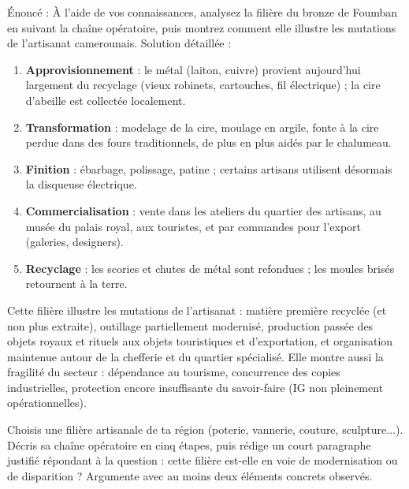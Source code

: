 \documentclass[11pt]{article}
\begin{document}
\begin{exoresolu}
Énoncé : À l'aide de vos connaissances, analysez la filière du bronze de Foumban en suivant la chaîne opératoire, puis montrez comment elle illustre les mutations de l'artisanat camerounais.
\tcblower
Solution détaillée :
\begin{enumerate}
\item \textbf{Approvisionnement} : le métal (laiton, cuivre) provient aujourd'hui largement du recyclage (vieux robinets, cartouches, fil électrique) ; la cire d'abeille est collectée localement.
\item \textbf{Transformation} : modelage de la cire, moulage en argile, fonte à la cire perdue dans des fours traditionnels, de plus en plus aidés par le chalumeau.
\item \textbf{Finition} : ébarbage, polissage, patine ; certains artisans utilisent désormais la disqueuse électrique.
\item \textbf{Commercialisation} : vente dans les ateliers du quartier des artisans, au musée du palais royal, aux touristes, et par commandes pour l'export (galeries, designers).
\item \textbf{Recyclage} : les scories et chutes de métal sont refondues ; les moules brisés retournent à la terre.
\end{enumerate}
Cette filière illustre les mutations de l'artisanat : matière première recyclée (et non plus extraite), outillage partiellement modernisé, production passée des objets royaux et rituels aux objets touristiques et d'exportation, et organisation maintenue autour de la chefferie et du quartier spécialisé. Elle montre aussi la fragilité du secteur : dépendance au tourisme, concurrence des copies industrielles, protection encore insuffisante du savoir-faire (IG non pleinement opérationnelles).
\end{exoresolu}

\begin{exercice}[À faire]
Choisis une filière artisanale de ta région (poterie, vannerie, couture, sculpture...). Décris sa chaîne opératoire en cinq étapes, puis rédige un court paragraphe justifié répondant à la question : cette filière est-elle en voie de modernisation ou de disparition ? Argumente avec au moins deux éléments concrets observés.
\end{exercice}
\end{document}
